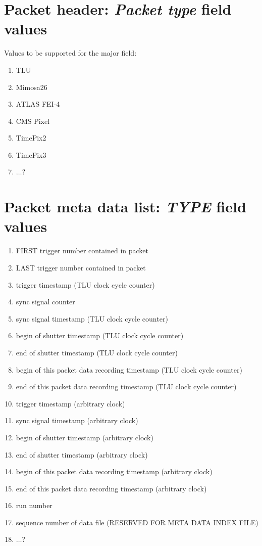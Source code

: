 \documentclass[paper=a4, fontsize=11pt]{scrartcl}	%
\numberwithin{equation}{section}		%
\numberwithin{figure}{section}			%
\numberwithin{table}{section}				%
\begin{document}
\newpage
\appendix

\section{Packet header: \emph{Packet type} field values}
\label{app:packettype}
Values to be supported for the major field:
\begin{enumerate}
\item TLU
\item Mimosa26
\item ATLAS FEI-4
\item CMS Pixel
\item TimePix2
\item TimePix3
\item $\ldots$?
\end{enumerate}

\section{Packet meta data list: \emph{TYPE} field values}
\label{app:typeid}
\begin{enumerate}
\item FIRST trigger number contained in packet
\item LAST trigger number contained in packet
\item trigger timestamp (TLU clock cycle counter)
\item sync signal counter
\item sync signal timestamp (TLU clock cycle counter)
\item begin of shutter timestamp (TLU clock cycle counter)
\item end of shutter timestamp (TLU clock cycle counter)
\item begin of this packet data recording timestamp (TLU clock cycle counter)
\item end of this packet data recording timestamp (TLU clock cycle counter)
\item trigger timestamp (arbitrary clock)
\item sync signal timestamp (arbitrary clock)
\item begin of shutter timestamp (arbitrary clock)
\item end of shutter timestamp (arbitrary clock)
\item begin of this packet data recording timestamp (arbitrary clock)
\item end of this packet data recording timestamp (arbitrary clock)
\item run number
\item sequence number of data file (RESERVED FOR META DATA INDEX FILE)
\item $\ldots$?
\end{enumerate}
\end{document}
